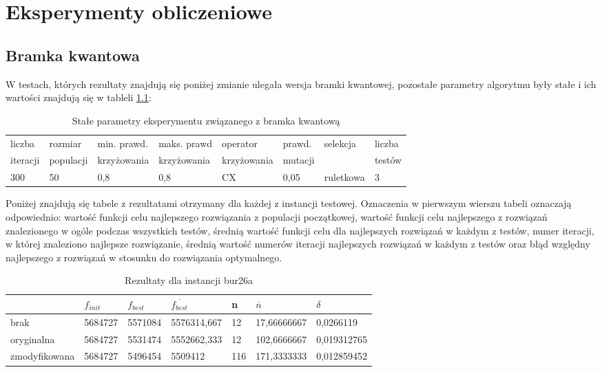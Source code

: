 \chapter{Eksperymenty obliczeniowe}
\label{cha:eksperymenty}
\section{Bramka kwantowa}
W testach, których rezultaty znajdują się poniżej zmianie ulegała wersja bramki kwantowej, pozostałe parametry algorytmu były stałe i ich wartości znajdują się w tableli \ref{T1_params}:

\begin{table}[H]
\label{T1_params}
\begin{tabular}{l l l l l l l l}
\hline
liczba & rozmiar & min. prawd. & maks. prawd & operator & prawd. & selekcja & liczba \\
iteracji & populacji & krzyżowania & krzyżowania & krzyżowania & mutacji & & testów \\
\hline
300 & 50 & 0,8 & 0,8 & CX & 0,05 & ruletkowa & 3 \\
\hline
\end{tabular}
\caption{Stałe parametry eksperymentu związanego z bramka kwantową}
\end{table}

Poniżej znajdują się tabele z rezultatami otrzymany dla każdej z instancji testowej. Oznaczenia w pierwszym wierszu tabeli oznaczają odpowiednio: wartość funkcji celu najlepszego rozwiązania z populacji początkowej, wartość funkcji celu najlepszego z rozwiązań znalezionego w ogóle podczas wszystkich testów, średnią wartość funkcji celu dla najlepszych rozwiązań w każdym z testów, numer iteracji, w której znaleziono najlepsze rozwiązanie, średnią wartość numerów iteracji najlepszych rozwiązań w każdym z testów oraz błąd względny najlepszego z rozwiązań w stosunku do rozwiązania optymalnego.

\begin{table}[H]
\label{T1_bur26a}
\begin{tabular}{l l l l l l l}
\hline
 & $f_{init}$ & $f_{best}$ & $\overline{f_{best}}$ & n & $\overline{n}$ & $\delta$ \\
\hline
brak & 5684727 & 5571084 & 5576314,667 & 12 & 17,66666667 & 0,0266119 \\
oryginalna & 5684727 & 5531474 & 5552662,333 & 12 & 102,6666667 & 0,019312765 \\
zmodyfikowana & 5684727 & 5496454 & 5509412 & 116 & 171,3333333 & 0,012859452 \\
\hline
\end{tabular}
\caption{Rezultaty dla instancji bur26a}
\end{table}

